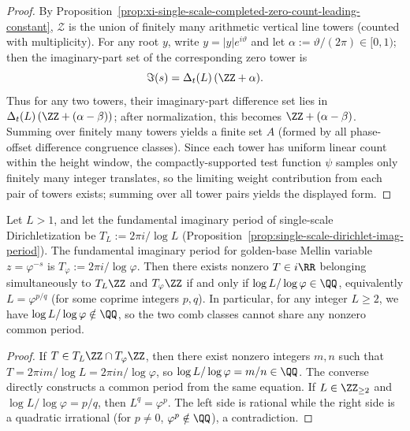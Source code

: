 \begin{proof}
By Proposition~\ref{prop:xi-single-scale-completed-zero-count-leading-constant}, \(\mathcal Z\) is the union of finitely many arithmetic vertical line towers (counted with multiplicity).
For any root \(y\), write \(y=|y|e^{i\vartheta}\) and let \(\alpha:=\vartheta/(2\pi)\in[0,1)\); then the imaginary-part set of the corresponding zero tower is
\[
\Im(s)=\Delta_t(L)\,(\ZZ+\alpha).
\]
Thus for any two towers, their imaginary-part difference set lies in
\(
\Delta_t(L)\,(\ZZ+(\alpha-\beta))
\);
after normalization, this becomes \(\ZZ+(\alpha-\beta)\).
Summing over finitely many towers yields a finite set \(A\) (formed by all phase-offset difference congruence classes).
Since each tower has uniform linear count within the height window, the compactly-supported test function \(\psi\) samples only finitely many integer translates, so the limiting weight contribution from each pair of towers exists; summing over all tower pairs yields the displayed form.
\end{proof}

\begin{proposition}\label{prop:xi-comb-incommensurability-logL-logphi}
Let \(L>1\), and let the fundamental imaginary period of single-scale Dirichletization be
\(
T_L:=2\pi i/\log L
\)
(Proposition~\ref{prop:single-scale-dirichlet-imag-period}).
The fundamental imaginary period for golden-base Mellin variable \(z=\varphi^{-s}\) is
\(
T_\varphi:=2\pi i/\log\varphi
\).
Then there exists nonzero \(T\in i\RR\) belonging simultaneously to \(T_L\ZZ\) and \(T_\varphi\ZZ\) if and only if \(\log L/\log\varphi\in\QQ\), equivalently \(L=\varphi^{p/q}\) (for some coprime integers \(p,q\)).
In particular, for any integer \(L\ge 2\), we have \(\log L/\log\varphi\notin\QQ\), so the two comb classes cannot share any nonzero common period.
\end{proposition}

\begin{proof}
If \(T\in T_L\ZZ\cap T_\varphi\ZZ\), then there exist nonzero integers \(m,n\) such that
\(
T=2\pi i m/\log L=2\pi i n/\log\varphi
\), so \(\log L/\log\varphi=m/n\in\QQ\).
The converse directly constructs a common period from the same equation.
If \(L\in\ZZ_{\ge2}\) and \(\log L/\log\varphi=p/q\), then \(L^q=\varphi^p\).
The left side is rational while the right side is a quadratic irrational (for \(p\neq 0\), \(\varphi^p\notin\QQ\)), a contradiction.
\end{proof}

